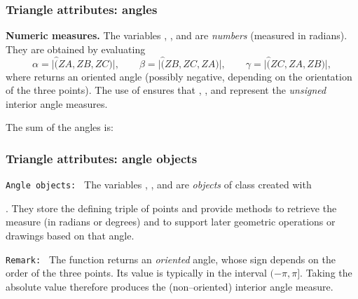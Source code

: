\subsubsection{Triangle attributes: angles} %
\label{ssub:triangle_attributes_angles}
\noindent\textbf{Numeric measures.}
The variables , , and  are \emph{numbers}
(measured in radians). They are obtained by evaluating
\[
\alpha = \lvert \widehat(ZA,ZB,ZC)\rvert,\qquad
\beta  = \lvert \widehat(ZB,ZC,ZA)\rvert,\qquad
\gamma = \lvert \widehat(ZC,ZA,ZB)\rvert,
\]
where  returns an oriented angle (possibly negative,
depending on the orientation of the three points). The use of
 ensures that , , and 
represent the \emph{unsigned} interior angle measures.

\begin{tkzexample}[latex=.5\textwidth-2cm]
\def\wangle#1{\tkzPN[2]{%
    \tkzUseLua{math.deg(T.ABC.#1)}}}
\begin{center}
\end{center}
The sum of the angles is: 
\end{tkzexample}


\subsubsection{Triangle attributes: angle objects} %
\label{ssub:triangle_attributes_angles_objects}
\noindent\texttt{Angle objects: }
The variables , , and  are
\emph{objects} of class  created with

.
They store the defining triple of points and provide methods to
retrieve the measure (in radians or degrees) and to support later
geometric operations or drawings based on that angle.

\medskip
\noindent\texttt{Remark: }
The function  returns an \emph{oriented} angle,
whose sign depends on the order of the three points.
Its value is typically in the interval $(-\pi,\pi]$.
Taking the absolute value therefore produces the
(non--oriented) interior angle measure.

